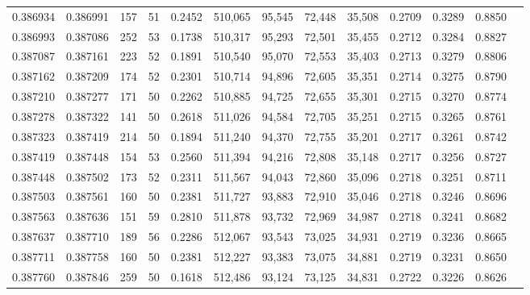 \begin{tabular}{rrrrrrrrrrrrr}
0.386934 & 0.386991 &   157 &  51 &                                     0.2452 & 510,065 &  95,545 &  72,448 &  35,508 & 0.2709 & 0.3289 & 0.8850 \\
0.386993 & 0.387086 &   252 &  53 &                                     0.1738 & 510,317 &  95,293 &  72,501 &  35,455 & 0.2712 & 0.3284 & 0.8827 \\
0.387087 & 0.387161 &   223 &  52 &                                     0.1891 & 510,540 &  95,070 &  72,553 &  35,403 & 0.2713 & 0.3279 & 0.8806 \\
0.387162 & 0.387209 &   174 &  52 &                                     0.2301 & 510,714 &  94,896 &  72,605 &  35,351 & 0.2714 & 0.3275 & 0.8790 \\
0.387210 & 0.387277 &   171 &  50 &                                     0.2262 & 510,885 &  94,725 &  72,655 &  35,301 & 0.2715 & 0.3270 & 0.8774 \\
0.387278 & 0.387322 &   141 &  50 &                                     0.2618 & 511,026 &  94,584 &  72,705 &  35,251 & 0.2715 & 0.3265 & 0.8761 \\
0.387323 & 0.387419 &   214 &  50 &                                     0.1894 & 511,240 &  94,370 &  72,755 &  35,201 & 0.2717 & 0.3261 & 0.8742 \\
0.387419 & 0.387448 &   154 &  53 &                                     0.2560 & 511,394 &  94,216 &  72,808 &  35,148 & 0.2717 & 0.3256 & 0.8727 \\
0.387448 & 0.387502 &   173 &  52 &                                     0.2311 & 511,567 &  94,043 &  72,860 &  35,096 & 0.2718 & 0.3251 & 0.8711 \\
0.387503 & 0.387561 &   160 &  50 &                                     0.2381 & 511,727 &  93,883 &  72,910 &  35,046 & 0.2718 & 0.3246 & 0.8696 \\
0.387563 & 0.387636 &   151 &  59 &                                     0.2810 & 511,878 &  93,732 &  72,969 &  34,987 & 0.2718 & 0.3241 & 0.8682 \\
0.387637 & 0.387710 &   189 &  56 &                                     0.2286 & 512,067 &  93,543 &  73,025 &  34,931 & 0.2719 & 0.3236 & 0.8665 \\
0.387711 & 0.387758 &   160 &  50 &                                     0.2381 & 512,227 &  93,383 &  73,075 &  34,881 & 0.2719 & 0.3231 & 0.8650 \\
0.387760 & 0.387846 &   259 &  50 &                                     0.1618 & 512,486 &  93,124 &  73,125 &  34,831 & 0.2722 & 0.3226 & 0.8626 \\

\end{tabular}
